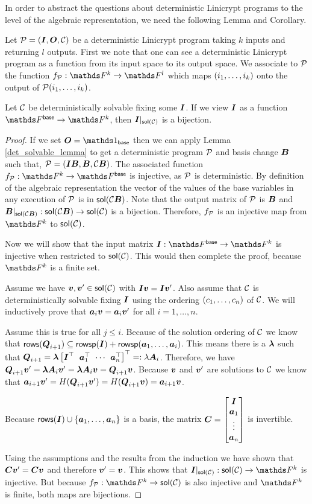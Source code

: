 In order to abstract the questions about deterministic Linicrypt programs to the level of the algebraic representation,
we need the following Lemma and Corollary.

Let $\P = (\I, \O, \C)$ be a deterministic Linicrypt program taking $k$ inputs and returning $l$ outputs.
First we note that one can see a deterministic Linicrypt program as a function from its input space to its output space.
We associate to $\P$ the function $f_\P: \F^k \to \F^l$ which maps $(\dts i k)$ onto the output of $\P(\dts i k)$.

\begin{lemma}
\label{solution_space_bijection}
    Let $\C$ be deterministically solvable fixing some $\I$.
    If we view $\I$ as a function $\Fsp \to \F^k$,
    then $\I|_{\sol(\C)}$ is a bijection.
\end{lemma}

\begin{proof}
    If we set $\O = \Id_\base$
    then we can apply Lemma \ref{det_solvable_lemma} to get a deterministic program $\P$ and basis change $\B$ such that,
    $\P = (\I\B, \B, \C\B)$. 
    The associated function $f_{\P}: \F^k \to \F^\base$ is injective,
    as $\P$ is deterministic.
    By definition of the algebraic representation 
    the vector of the values of the base variables in any execution of $\P$ is in $\sol(\C\B)$.
    Note that the output matrix of $\P$ is $\B$ 
    and $\B|_{\sol(\C\B)}: \sol(\C\B) \to \sol(\C)$ is a bijection.
    Therefore, $f_\P$ is an injective map from $\F^k$ to $\sol(\C)$.

    Now we will show that the input matrix $\I: \Fsp \to \F^k$ is injective
    when restricted to $\sol(\C)$.
    This would then complete the proof, because $\F^k$ is a finite set.
    
    Assume we have $\vv, \vv' \in \sol(\C)$ with $\I\vv = \I\vv'$.
    Also assume that $\C$ is deterministically solvable fixing $\I$
    using the ordering $(\dts c n)$ of $\C$.
    We will inductively prove that $\va_i \vv = \va_i \vv'$ for all $i = 1, \dots, n$.

    Assume this is true for all $ j \leq i$.
    Because of the solution ordering of $\C$ we know that
    $\rows(\Q_{i+1}) \subseteq \rowsp(\I) + \rowsp(\dts \va {i})$. 
    This means there is a $\v \lambda$ such that $\Q_{i+1} = \v \lambda \m{\I^\top & \va_1^\top & \cdots & \va_n^\top}^\top =: \lambda \v A_i$.
    Therefore, we have $\Q_{i+1} \vv' = \vl \v A_i \vv' = \vl \v A_i \vv = \Q_{i+1} \vv$.
    Because $\vv$ and $\vv'$ are solutions to $\C$ we know that
    $\va_{i+1}\vv' = \H(\Q_{i+1}\vv') = \H(\Q_{i+1}\vv) = \va_{i+1}\vv$.

    Because $\rows(\I) \cup \{\va_1, \dots, \va_n\}$ is a basis, 
    the matrix 
    $
    \v C = \m{\I \\ \vdts \va n}
    $
    is invertible.

    Using the assumptions and the results from the induction we have shown that $\v C \vv' = \v C \vv$ and
    therefore $\vv' = \vv$.
    This shows that $\I|_{\sol(\C)}: \sol(\C) \to \F^k$ is injective.
    But because $f_\P: \F^k \to \sol(\C)$ is also injective
    and $\F^k$ is finite,
    both maps are bijections.
\end{proof}

